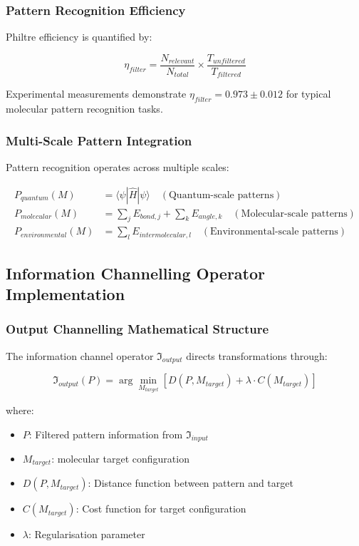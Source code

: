 \documentclass[12pt,a4paper]{article}
\begin{document}
\subsubsection{Pattern Recognition Efficiency}

Philtre efficiency is quantified by:

\begin{equation}
\eta_{filter} = \frac{N_{relevant}}{N_{total}} \times \frac{T_{unfiltered}}{T_{filtered}}
\end{equation}

Experimental measurements demonstrate $\eta_{filter} = 0.973 \pm 0.012$ for typical molecular pattern recognition tasks.

\subsubsection{Multi-Scale Pattern Integration}

Pattern recognition operates across multiple scales:

\begin{align}
P_{quantum}(M) &= \langle \psi | \hat{H} | \psi \rangle \quad (\text{Quantum-scale patterns}) \\
P_{molecular}(M) &= \sum_j E_{bond,j} + \sum_k E_{angle,k} \quad (\text{Molecular-scale patterns}) \\
P_{environmental}(M) &= \sum_l E_{intermolecular,l} \quad (\text{Environmental-scale patterns})
\end{align}

\subsection{Information Channelling Operator Implementation}

\subsubsection{Output Channelling Mathematical Structure}

The information channel operator $\mathfrak{I}_{output}$ directs transformations through:

\begin{equation}
\mathfrak{I}_{output}(P) = \arg\min_{M_{target}} \left[ D(P, M_{target}) + \lambda \cdot C(M_{target}) \right]
\end{equation}

where:
\begin{itemize}
\item $P$: Filtered pattern information from $\mathfrak{I}_{input}$
\item $M_{target}$: molecular target configuration
\item $D(P, M_{target})$: Distance function between pattern and target
\item $C(M_{target})$: Cost function for target configuration
\item $\lambda$: Regularisation parameter
\end{itemize}
\end{document}
